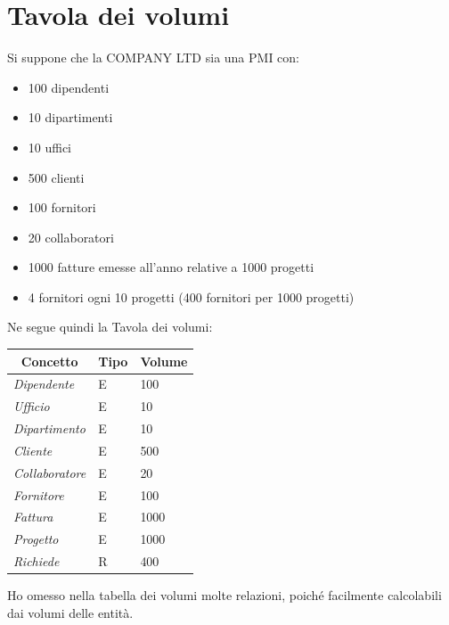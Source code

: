 \documentclass[12pt,a4paper]{article}
\begin{document}
\section{Tavola dei volumi}\label{sec:tavola-dei-volumi}
Si suppone che la COMPANY LTD sia una PMI con: 
\begin{itemize}
\item 100 dipendenti
\item 10 dipartimenti
\item 10 uffici
\item 500 clienti
\item 100 fornitori
\item 20 collaboratori
\item 1000 fatture emesse all'anno relative a 1000 progetti
\item 4 fornitori ogni 10 progetti (400 fornitori per 1000 progetti)
\end{itemize}
Ne segue quindi la Tavola dei volumi:

\begin{center}
\begin{tabular}{|l|l|l|}
\hline
\multicolumn{1}{|c|}{\textbf{Concetto}} & \multicolumn{1}{c|}{\textbf{Tipo}} & \multicolumn{1}{c|}{\textbf{Volume}} \\ \hline \hline
\textit{Dipendente} & E & 100 \\
\textit{Ufficio} & E & 10 \\
\textit{Dipartimento} & E & 10 \\
\textit{Cliente} & E & 500 \\
\textit{Collaboratore} & E & 20 \\
\textit{Fornitore} & E & 100 \\
\textit{Fattura} & E & 1000 \\
\textit{Progetto} & E & 1000 \\
\textit{Richiede} & R & 400\\ \hline
\end{tabular}\end{center}
Ho omesso nella tabella dei volumi molte relazioni, poiché facilmente calcolabili dai volumi delle entità.

\end{document}
